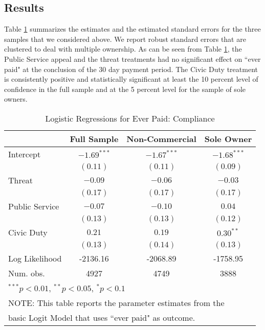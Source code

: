 \documentclass[12pt,titlepage]{article}
\begin{document}
\subsection{Results}
  
Table \ref{table:ep_log_I} summarizes the estimates and the estimated standard
errors for the three samples that we considered above. We report
robust standard errors that are clustered to deal with multiple
ownership. As can be seen from Table \ref{table:ep_log_I}, the Public Service appeal and
the threat treatments had no significant effect on ``ever paid" at the
conclusion of the 30 day payment period.  The Civic Duty treatment is
consistently positive and statistically significant at least the 10
percent level of confidence in the full sample and at the 5
percent level for the sample of sole owners.

\begin{table}[htbp]
\caption{Logistic Regressions for Ever Paid: Compliance}
\label{table:ep_log_I}
\begin{center}
\begin{tabular}{l c c c }
\hline
               & Full Sample & Non-Commercial & Sole Owner \\
\hline
Intercept      & $-1.69^{***}$ & $-1.67^{***}$ & $-1.68^{***}$ \\
               & $(0.11)$      & $(0.11)$      & $(0.09)$      \\
Threat         & $-0.09$       & $-0.06$       & $-0.03$       \\
               & $(0.17)$      & $(0.17)$      & $(0.17)$      \\
Public Service & $-0.07$       & $-0.10$       & $0.04$        \\
               & $(0.13)$      & $(0.13)$      & $(0.12)$      \\
Civic Duty     & $0.21$        & $0.19$        & $0.30^{**}$   \\
               & $(0.13)$      & $(0.14)$      & $(0.13)$      \\
\hline
Log Likelihood & -2136.16      & -2068.89      & -1758.95      \\
Num. obs.      & 4927          & 4749          & 3888          \\
\hline
\multicolumn{4}{l}{\scriptsize{$^{***}p<0.01$, $^{**}p<0.05$, $^*p<0.1$}} \\
\multicolumn{4}{l}{NOTE: This table reports the parameter estimates from the} \\
\multicolumn{4}{l}{basic Logit Model that uses ``ever paid" as outcome.}
\end{tabular}
\end{center}
\end{table}
\end{document}
